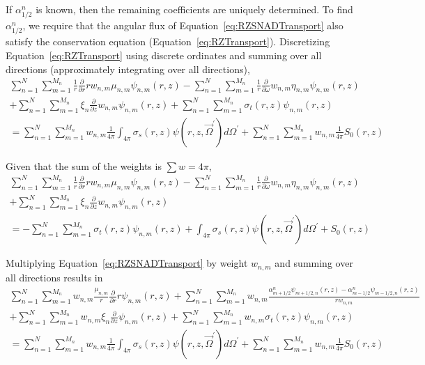 \documentclass[12pt]{article}
\begin{document}
\noindent If $\alpha_{1/2}^n$ is known, then the remaining coefficients are uniquely determined. To find $\alpha_{1/2}^n$, we require that the angular flux of Equation~\ref{eq:RZSNADTransport} also satisfy the conservation equation (Equation~\ref{eq:RZTransport}).
%
\iffalse
Discretizing Equation~\ref{eq:RZTransport} using discrete ordinates and summing over all directions (approximately integrating over all directions),
\begin{multline}
\sum_{n=1}^N \sum_{m=1}^{M_n} \frac{1}{r} \frac{\partial}{\partial r} r w_{n,m} \mu_{n,m} \psi_{n,m} \left(r,z \right) - \sum_{n=1}^N \sum_{m=1}^{M_n} \frac{1}{r} \frac{\partial}{\partial \omega} w_{n,m} \eta_{n,m} \psi_{n,m} \left(r,z \right) \\
+ \sum_{n=1}^N \sum_{m=1}^{M_n} \xi_n \frac{\partial}{\partial z} w_{n,m} \psi_{n,m} \left(r,z \right) + \sum_{n=1}^N \sum_{m=1}^{M_n} \sigma_t \left(r,z \right) \psi_{n,m} \left(r,z \right) \\
= \sum_{n=1}^N \sum_{m=1}^{M_n} w_{n,m} \frac{1}{4 \pi} \int_{4 \pi} \sigma_s \left(r,z \right) \psi \left(r,z, \vec{\Omega}^\prime \right) d \Omega^\prime + \sum_{n=1}^N \sum_{m=1}^{M_n} w_{n,m} \frac{1}{4 \pi} S_0 \left(r,z \right)
\end{multline}

\noindent Given that the sum of the weights is $\sum w = 4 \pi$,
\begin{multline}
\sum_{n=1}^N \sum_{m=1}^{M_n} \frac{1}{r} \frac{\partial}{\partial r} r w_{n,m} \mu_{n,m} \psi_{n,m} \left(r,z \right) - \sum_{n=1}^N \sum_{m=1}^{M_n} \frac{1}{r} \frac{\partial}{\partial \omega} w_{n,m} \eta_{n,m} \psi_{n,m} \left(r,z \right) \\
+ \sum_{n=1}^N \sum_{m=1}^{M_n} \xi_n \frac{\partial}{\partial z} w_{n,m} \psi_{n,m} \left(r,z \right) \\
= - \sum_{n=1}^N \sum_{m=1}^{M_n} \sigma_t \left(r,z \right) \psi_{n,m} \left(r,z \right) + \int_{4 \pi} \sigma_s \left(r,z \right) \psi \left(r,z, \vec{\Omega}^\prime \right) d \Omega^\prime +  S_0 \left(r,z \right)
\end{multline}

\noindent Multiplying Equation~\ref{eq:RZSNADTransport} by weight $w_{n,m}$ and summing over all directions results in
\begin{multline}
\sum_{n=1}^N \sum_{m=1}^{M_n} w_{n,m} \frac{\mu_{n,m}}{r} \frac{\partial}{\partial r} r \psi_{n,m} \left(r,z \right) + \sum_{n=1}^N \sum_{m=1}^{M_n} w_{n,m} \frac{\alpha_{m+1/2}^n \psi_{m+1/2,n} (r,z) - \alpha_{m-1/2}^n \psi_{m-1/2,n} (r,z)}{r w_{n,m}} \\
+ \sum_{n=1}^N \sum_{m=1}^{M_n} w_{n,m} \xi_n \frac{\partial}{\partial z} \psi_{n,m} \left(r,z \right) + \sum_{n=1}^N \sum_{m=1}^{M_n} w_{n,m} \sigma_t \left(r,z \right) \psi_{n,m} \left(r,z \right) \\
= \sum_{n=1}^N \sum_{m=1}^{M_n} w_{n,m} \frac{1}{4 \pi} \int_{4 \pi} \sigma_s \left(r,z \right) \psi \left(r,z, \vec{\Omega}^\prime \right) d \Omega^\prime + \sum_{n=1}^N \sum_{m=1}^{M_n} w_{n,m} \frac{1}{4 \pi} S_0 \left(r,z \right)
\end{multline}
\end{document}
